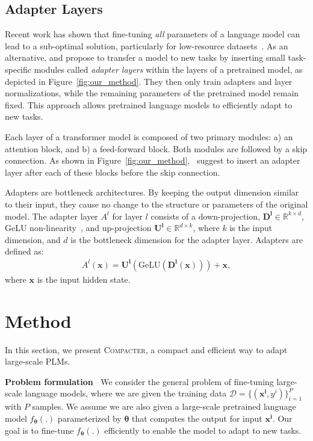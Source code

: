 \documentclass{article}
\newcommand{\compacter}{\textsc{Compacter}\xspace}
\begin{document}
\subsection{Adapter Layers}\label{sec:adapters}
Recent work has shown that fine-tuning \emph{all} parameters of a language model can lead to a sub-optimal solution, particularly for low-resource datasets~\citep{peters-2019-tune}. As an alternative, \citet{rebuffi2018efficient} and \citet{houlsby2019parameter} propose to transfer a model to new tasks by inserting small task-specific modules called \emph{adapter layers} within the layers of a pretrained model, as depicted in Figure~\ref{fig:our_method}. They then only train adapters and layer normalizations, while the remaining parameters of the pretrained model remain fixed. This approach allows pretrained language models to efficiently adapt to new tasks. 

Each layer of a transformer model is composed of two primary modules: a) an attention block, and b) a feed-forward block. Both modules are followed by a skip connection. 
As shown in Figure~\ref{fig:our_method},~\citet{houlsby2019parameter} suggest to insert an adapter layer after each of these blocks before the skip connection. 

Adapters are bottleneck architectures. By keeping the output dimension similar to their input, they cause no change to the structure or parameters of the original model. The adapter layer $A^l$ for layer $l$ consists of a down-projection, $\bm{D^l}\in\mathbb{R}^{k\times d}$, GeLU non-linearity~\citep{hendrycks2016gaussian}, and up-projection $\bm{U^l} \in\mathbb{R}^{d \times k}$, where $k$ is the input dimension, and $d$ is the bottleneck dimension for the adapter layer. Adapters are defined as:
\begin{align}
A^l(\bm{x}) = \bm{U^l}(\text{GeLU}(\bm{D^l}(\bm{x}))) + \bm{x}, \label{eq:adapters}
\end{align}
where $\bm{x}$ is the input hidden state.

\section{Method}
In this section, we present \compacter, a compact and efficient way to adapt large-scale PLMs. 

\noindent \textbf{Problem formulation} $\:$ We consider the general problem of fine-tuning large-scale language models, where we are given the training data  $\mathcal{D}= \{(\bm{x^i}, y^i)\}_{i=1}^{P}$ with $P$ samples. We assume we are also given a large-scale pretrained language model $f_{\bm{\theta}}(.)$ parameterized by $\bm{\theta}$ that computes the output for input $\bm{x^i}$.
Our goal is to fine-tune  $f_{\bm{\theta}}(.)$ efficiently to  enable the model to adapt to new tasks. 
\end{document}
